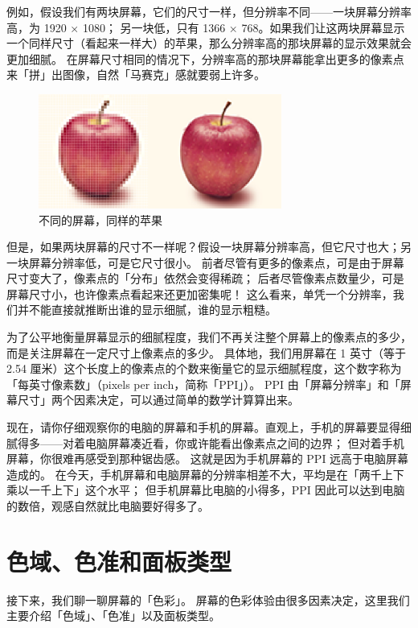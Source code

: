 例如，假设我们有两块屏幕，它们的尺寸一样，但分辨率不同——一块屏幕分辨率高，为 1920 × 1080；
另一块低，只有 1366 × 768。如果我们让这两块屏幕显示一个同样尺寸（看起来一样大）的苹果，那么分辨率高的那块屏幕的显示效果就会更加细腻。
在屏幕尺寸相同的情况下，分辨率高的那块屏幕能拿出更多的像素点来「拼」出图像，自然「马赛克」感就要弱上许多。

\begin{figure}[htb!]
  \centering
  \includegraphics[width=8cm]{assets/Different_Apple.png}
  \caption{不同的屏幕，同样的苹果}
  \label{Different_Apple}
\end{figure}

但是，如果两块屏幕的尺寸不一样呢？假设一块屏幕分辨率高，但它尺寸也大；另一块屏幕分辨率低，可是它尺寸很小。
前者尽管有更多的像素点，可是由于屏幕尺寸变大了，像素点的「分布」依然会变得稀疏；
后者尽管像素点数量少，可是屏幕尺寸小，也许像素点看起来还更加密集呢！
这么看来，单凭一个分辨率，我们并不能直接就推断出谁的显示细腻，谁的显示粗糙。

为了公平地衡量屏幕显示的细腻程度，我们不再关注整个屏幕上的像素点的多少，而是关注屏幕在一定尺寸上像素点的多少。
具体地，我们用屏幕在 1 英寸（等于 2.54 厘米）这个长度上的像素点的个数来衡量它的显示细腻程度，这个数字称为「每英寸像素数」（pixels per inch，简称「PPI」）。
PPI 由「屏幕分辨率」和「屏幕尺寸」两个因素决定，可以通过简单的数学计算算出来。

现在，请你仔细观察你的电脑的屏幕和手机的屏幕。直观上，手机的屏幕要显得细腻得多——对着电脑屏幕凑近看，你或许能看出像素点之间的边界；
但对着手机屏幕，你很难再感受到那种锯齿感。
这就是因为手机屏幕的 PPI 远高于电脑屏幕造成的。
在今天，手机屏幕和电脑屏幕的分辨率相差不大，平均是在「两千上下乘以一千上下」这个水平；
但手机屏幕比电脑的小得多，PPI 因此可以达到电脑的数倍，观感自然就比电脑要好得多了。

\section{色域、色准和面板类型}

接下来，我们聊一聊屏幕的「色彩」。
屏幕的色彩体验由很多因素决定，这里我们主要介绍「色域」、「色准」以及面板类型。

